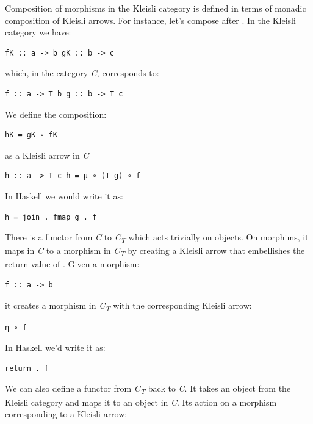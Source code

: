 Composition of morphisms in the Kleisli category is defined in terms of
monadic composition of Kleisli arrows. For instance, let's compose
 after . In the Kleisli category we have:

\begin{verbatim}
fK :: a -> b gK :: b -> c
\end{verbatim}

which, in the category \emph{C}, corresponds to:

\begin{verbatim}
f :: a -> T b g :: b -> T c
\end{verbatim}

We define the composition:

\begin{verbatim}
hK = gK ∘ fK
\end{verbatim}

as a Kleisli arrow in \emph{C}

\begin{verbatim}
h :: a -> T c h = μ ∘ (T g) ∘ f
\end{verbatim}

In Haskell we would write it as:

\begin{verbatim}
h = join . fmap g . f
\end{verbatim}

There is a functor  from \emph{C} to \emph{C\textsubscript{T}}
which acts trivially on objects. On morphims, it maps  in
\emph{C} to a morphism in \emph{C\textsubscript{T}} by creating a
Kleisli arrow that embellishes the return value of . Given a
morphism:

\begin{verbatim}
f :: a -> b
\end{verbatim}

it creates a morphism in \emph{C\textsubscript{T}} with the
corresponding Kleisli arrow:

\begin{verbatim}
η ∘ f
\end{verbatim}

In Haskell we'd write it as:

\begin{verbatim}
return . f
\end{verbatim}

We can also define a functor  from \emph{C\textsubscript{T}}
back to \emph{C}. It takes an object  from the Kleisli
category and maps it to an object  in \emph{C}. Its action
on a morphism  corresponding to a Kleisli arrow:

